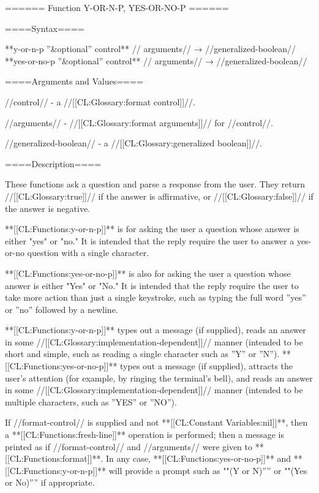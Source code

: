 ====== Function Y-OR-N-P, YES-OR-NO-P ======

====Syntax====

**{y-or-n-p} {''&optional'' control** //\rest} arguments// → //generalized-boolean// **{yes-or-no-p} {''&optional'' control** //\rest} arguments// → //generalized-boolean//

====Arguments and Values====

//control// - a //[[CL:Glossary:format control]]//.

//arguments// - //[[CL:Glossary:format arguments]]// for //control//.

//generalized-boolean// - a //[[CL:Glossary:generalized boolean]]//.

====Description====

These functions ask a question and parse a response from the user. They return //[[CL:Glossary:true]]// if the answer is affirmative, or //[[CL:Glossary:false]]// if the answer is negative.

**[[CL:Functions:y-or-n-p]]** is for asking the user a question whose answer is either "yes" or "no." It is intended that the reply require the user to answer a yes-or-no question with a single character.

**[[CL:Functions:yes-or-no-p]]** is also for asking the user a question whose answer is either "Yes" or "No." It is intended that the reply require the user to take more action than just a single keystroke, such as typing the full word ''yes'' or ''no'' followed by a newline.

**[[CL:Functions:y-or-n-p]]** types out a message (if supplied), reads an answer in some //[[CL:Glossary:implementation-dependent]]// manner (intended to be short and simple, such as reading a single character such as ''Y'' or ''N''). **[[CL:Functions:yes-or-no-p]]** types out a message (if supplied), attracts the user's attention (for example, by ringing the terminal's bell), and reads an answer in some //[[CL:Glossary:implementation-dependent]]// manner (intended to be multiple characters, such as ''YES'' or ''NO'').

If //format-control// is supplied and not **[[CL:Constant Variables:nil]]**, then a **[[CL:Functions:fresh-line]]** operation is performed; then a message is printed as if //format-control// and //arguments// were given to **[[CL:Functions:format]]**. In any case, **[[CL:Functions:yes-or-no-p]]** and **[[CL:Functions:y-or-n-p]]** will provide a prompt such as ""(Y or N)'''' or ""(Yes or No)'''' if appropriate.

